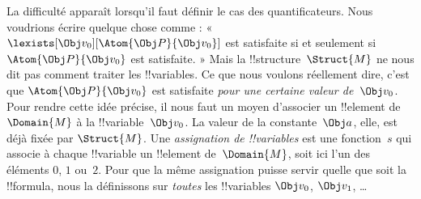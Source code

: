 \documentclass[../../../include/open-logic-section]{subfiles}
\begin{document}
La difficulté apparaît lorsqu'il faut définir le cas des
quantificateurs. Nous voudrions écrire quelque chose comme :
« $\lexists[\Obj v_0][\Atom{\Obj P}{\Obj v_0}]$ est satisfaite si et
seulement si $\Atom{\Obj P}{\Obj v_0}$ est satisfaite. » Mais la
!!{structure}~$\Struct{M}$ ne nous dit pas comment traiter les
!!{variable}s. Ce que nous voulons réellement dire, c'est que
$\Atom{\Obj P}{\Obj v_0}$ est satisfaite \emph{pour une certaine valeur
de~$\Obj v_0$}. Pour rendre cette idée précise, il nous faut un moyen
d'associer un !!{element} de~$\Domain{M}$ à la !!{variable}~$\Obj v_0$.
La valeur de la constante~$\Obj a$, elle, est déjà fixée par
$\Struct{M}$. Une \emph{assignation de !!{variable}s} est une
fonction~$s$ qui associe à chaque !!{variable} un !!{element}
de~$\Domain{M}$, soit ici l'un des éléments $0$, $1$ ou~$2$. Pour que
la même assignation puisse servir quelle que soit la !!{formula}, nous
la définissons sur \emph{toutes} les !!{variable}s
$\Obj v_0$, $\Obj v_1$, \dots\@
\end{document}
